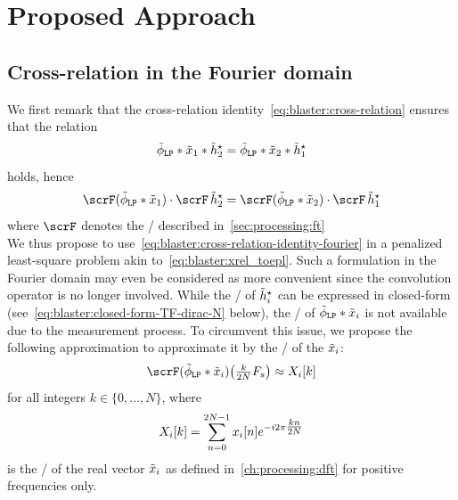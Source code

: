 \section{Proposed Approach}
\subsection{Cross-relation in the Fourier domain}

\newcommand{\paramVec}[1]{\Delta_{#1}}

We first remark that the cross-relation identity~\cref{eq:blaster:cross-relation} ensures that the relation
\begin{equation}
    \idealLowPassFilter
    \ast \contRecordedSignal_1
    \ast  \contFilter_2^\star
    =
    \idealLowPassFilter
    \ast \contRecordedSignal_2
    \ast  \contFilter_1^\star
\end{equation}
holds, hence
\begin{equation}
    \label{eq:blaster:cross-relation-identity-fourier}
    \fourierTrans(\idealLowPassFilter\ast\contRecordedSignal_1) \cdot \fourierTrans \contFilter_2^\star
    =
    \fourierTrans(\idealLowPassFilter\ast\contRecordedSignal_2) \cdot \fourierTrans \contFilter_1^\star
\end{equation}
where $\fourierTrans$ denotes the \FTdef/ described in~\cref{sec:processing:ft}
\\We thus propose to use~\cref{eq:blaster:cross-relation-identity-fourier} in a penalized least-square problem akin to~\cref{eq:blaster:xrel_toepl}.
Such a formulation in the Fourier domain may even be considered as more convenient since the convolution operator is no longer involved.
While the \FT/ of $\tilde{h}_i^\star$ can be expressed in closed-form (see~\cref{eq:blaster:closed-form-TF-dirac-N} below), the \FT/ of $\idealLowPassFilter\ast\contRecordedSignal_i$ is not available due to the measurement process.
To circumvent this issue, we propose the following approximation to approximate it by the \DFTdef/ of the $\tilde{x}_i$:
\begin{equation}
    \label{eq:blaster:approx-TF}
    \fourierTrans(\idealLowPassFilter\ast\contRecordedSignal_i)
    \kparen{\tfrac{k}{2N}F_s}
    \approx
    X_i[k]
\end{equation}
for all integers  $k \in \{0, \ldots, N\}$, where
\begin{equation}
    \label{eq:blaster:dft-Xi}
    X_i[k] = \sum_{n=0}^{2N-1}
    x_i[n]
    {e}^{-{i}2\pi \tfrac{kn}{2N}}
\end{equation}
is the \DFT/ of the real vector $\tilde{x}_i$ as defined in~\cref{ch:processing:dft} for positive frequencies only.

